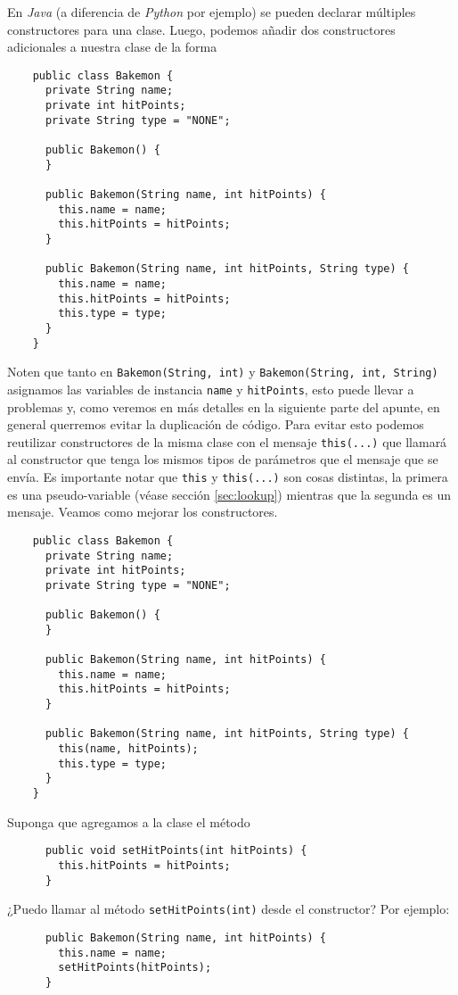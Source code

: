   En \textit{Java} (a diferencia de \textit{Python} por ejemplo) se pueden declarar múltiples 
  constructores para una clase.
  Luego, podemos añadir dos constructores adicionales a nuestra clase de la forma

  \begin{verbatim}
    public class Bakemon {
      private String name;
      private int hitPoints;
      private String type = "NONE";

      public Bakemon() {
      }

      public Bakemon(String name, int hitPoints) {
        this.name = name;
        this.hitPoints = hitPoints;
      }

      public Bakemon(String name, int hitPoints, String type) {
        this.name = name;
        this.hitPoints = hitPoints;
        this.type = type;
      }
    }
  \end{verbatim}

  Noten que tanto en \texttt{Bakemon(String, int)} y 
  \texttt{Bakemon(String, int, String)} asignamos las variables de instancia \texttt{name}
  y \texttt{hitPoints}, esto puede llevar a problemas y, como veremos en más detalles en la 
  siguiente parte del apunte, en general querremos evitar la duplicación de código.
  Para evitar esto podemos reutilizar constructores de la misma clase con el mensaje 
  \texttt{this(...)} que llamará al constructor que tenga los mismos tipos de parámetros
  que el mensaje que se envía.
  Es importante notar que \texttt{this} y \texttt{this(...)} son cosas 
  distintas, la primera es una pseudo-variable (véase sección \ref{sec:lookup}) mientras que la 
  segunda es un mensaje.
  Veamos como mejorar los constructores.

  \begin{verbatim}
    public class Bakemon {
      private String name;
      private int hitPoints;
      private String type = "NONE";

      public Bakemon() {
      }

      public Bakemon(String name, int hitPoints) {
        this.name = name;
        this.hitPoints = hitPoints;
      }

      public Bakemon(String name, int hitPoints, String type) {
        this(name, hitPoints);
        this.type = type;
      }
    }
  \end{verbatim}

  \begin{exercise}
    Suponga que agregamos a la clase el método
    \begin{verbatim}
      public void setHitPoints(int hitPoints) {
        this.hitPoints = hitPoints;
      }
    \end{verbatim}

    ¿Puedo llamar al método \texttt{setHitPoints(int)} desde el constructor?
    Por ejemplo:
    \begin{verbatim}
      public Bakemon(String name, int hitPoints) {
        this.name = name;
        setHitPoints(hitPoints);
      }
    \end{verbatim}
  \end{exercise}

